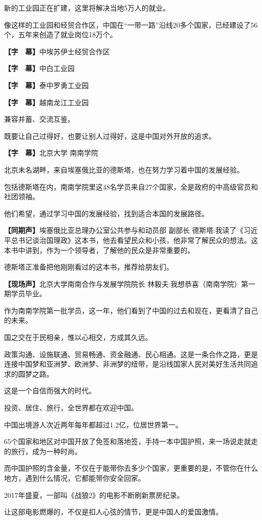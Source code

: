 \documentclass{ctexart}
\newcommand{\zkh}[1]{\textbf{\hspace{-2.7em} 【#1】}}
\begin{document}
新的工业园正在扩建，这里将解决当地5万人的就业。

像这样的工业园和经贸合作区，中国在``一带一路''沿线20多个国家，已经建设了56个，五年来创造了就业岗位18万个。

\zkh{字　幕}中埃苏伊士经贸合作区

\zkh{字　幕}中白工业园

\zkh{字　幕}泰中罗勇工业园

\zkh{字　幕}越南龙江工业园

兼容并蓄、交流互鉴。

既要让自己过得好，也要让别人过得好，这是中国对外开放的追求。

\zkh{字　幕}北京大学 南南学院

北京未名湖畔，来自埃塞俄比亚的德斯塔，也在努力学习着中国的发展经验。

包括德斯塔在内，南南学院里这48名学员来自27个国家，全是政府的中高级官员和社团领袖。

他们希望，通过学习中国的发展经验，找到适合本国的发展路径。

\zkh{同期声}埃塞俄比亚总理办公室公共参与和动员部 副部长 德斯塔:我读了《习近平总书记谈治国理政》这本书，他去看望民众和小孩，他非常了解民众的想法。这本书中讲到，作为一个领导者，了解他的民众是非常重要的。

德斯塔正准备把他刚刚看过的这本书，推荐给朋友们。

\zkh{现场声}北京大学南南合作与发展学院院长 林毅夫:我想恭喜（南南学院）第一期学员毕业。

作为南南学院第一批学员，这一年，他们看到了中国的过去和现在，更看清了自己的未来。

国之交在于民相亲，惟以心相交，方成其久远。

政策沟通、设施联通、贸易畅通、资金融通、民心相通。这是一条合作之路，更是连接中国梦和亚洲梦、欧洲梦、非洲梦的纽带，是沿线国家人民对美好生活共同追求的圆梦之路。

这是一个自信而强大的时代。

投资、居住、旅行，全世界都在欢迎中国。

中国出境游人次近两年每年都超过1.2亿，位居世界第一。

65个国家和地区对中国开放了免签和落地签，手持一本中国护照，来一场说走就走的旅行，成为一种时尚。

而中国护照的含金量，不仅在于能带你去多少个国家，更重要的是，不管你在什么地方，遇到什么情况，它都能带你安全回家。

2017年盛夏，一部叫《战狼2》的电影不断刷新票房纪录。

让这部电影燃爆的，不仅是扣人心弦的情节，更是中国人的爱国激情。
\end{document}
